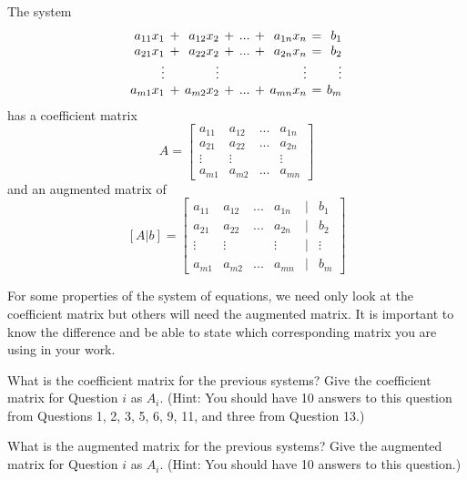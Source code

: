 The system
\begin{equation*}
\setlength{\arraycolsep}{2pt}
\begin{array}{rcrcrcrcr}
  a_{11} x_1  &+& a_{12} x_2 &+& ... &+&  a_{1n}x_n &=& b_1 \\ %
  a_{21} x_1  &+& a_{22} x_2 &+& ... &+&  a_{2n}x_n &=& b_2 \\
  \vdots  & & \vdots & &  & &  \vdots && \vdots \\
  a_{m1} x_1  &+& a_{m2} x_2 &+& ... &+&  a_{mn}x_n &=& b_m
\end{array}
\end{equation*}
has a coefficient matrix
$$A=\begin{bmatrix} a_{11} & a_{12} & ... &  a_{1n} \\
  a_{21}& a_{22}& ... &  a_{2n} \\
  \vdots  & \vdots &   &  \vdots   \\
  a_{m1}& a_{m2} & ... &  a_{mn}  \end{bmatrix}$$
and an augmented matrix of
$$[A|b]=\begin{bmatrix} a_{11} & a_{12} & ... &  a_{1n} &|&b_1\\
  a_{21}& a_{22}& ... &  a_{2n} &|&b_2\\
  \vdots  & \vdots &   &  \vdots &|& \vdots  \\
  a_{m1}& a_{m2} & ... &  a_{mn} &|&b_m \end{bmatrix}$$

For some properties of the system of equations, we need only look at the coefficient matrix but others will need the augmented matrix. It is important to know the difference and be able to state which corresponding matrix you are using in your work.

\begin{question} What is the coefficient matrix for the previous systems? Give the coefficient matrix for Question $i$ as $A_i$. (Hint: You should have 10 answers to this question from Questions 1, 2, 3, 5, 6, 9, 11, and three from Question 13.)
\end{question}

\begin{question} What is the augmented matrix for the previous systems? Give the augmented matrix for Question $i$ as $A_i$. (Hint: You should have 10 answers to this question.)
\end{question}

